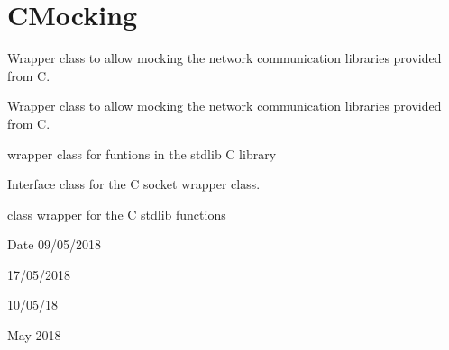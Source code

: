 \hypertarget{group__cMocking}{}\section{C\+Mocking}
\label{group__cMocking}


Wrapper class to allow mocking the network communication libraries provided from C.  


Wrapper class to allow mocking the network communication libraries provided from C. 

wrapper class for funtions in the stdlib C library

Interface class for the C socket wrapper class.

class wrapper for the C stdlib functions

\begin{DoxyDate}{Date}
09/05/2018

17/05/2018

10/05/18

May 2018 
\end{DoxyDate}
